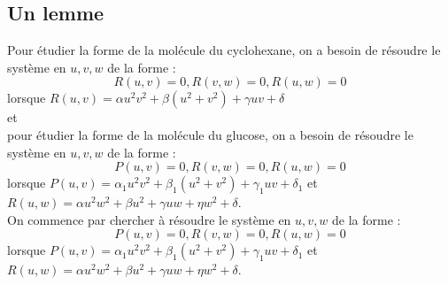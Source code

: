 \documentclass[a4paper,11pt]{book}
\begin{document}
\subsection{Un lemme}
Pour \'etudier la forme de la mol\'ecule du cyclohexane, on a besoin de 
r\'esoudre le syst\`eme en $u,v,w$ de la forme :
$$R(u,v)=0,R(v,w)=0,R(u,w)=0$$
lorsque $R(u,v)=\alpha u^2v^2+\beta(u^2+v^2)+\gamma uv+\delta$\\
et \\
pour \'etudier la forme de la mol\'ecule du glucose, on a besoin de 
r\'esoudre le syst\`eme en $u,v,w$ de la forme :
$$P(u,v)=0,R(v,w)=0,R(u,w)=0$$
lorsque $P(u,v)=\alpha_1 u^2v^2+\beta_1(u^2+v^2)+\gamma_1 uv+\delta_1$ et\\
 $R(u,w)=\alpha u^2w^2+\beta u^2+\gamma uw+\eta w^2+\delta$.\\
On commence par chercher \`a r\'esoudre le syst\`eme en $u,v,w$ de la forme :
$$P(u,v)=0,R(v,w)=0,R(u,w)=0$$
lorsque $P(u,v)=\alpha_1 u^2v^2+\beta_1(u^2+v^2)+\gamma_1 uv+\delta_1$ et\\
 $R(u,w)=\alpha u^2w^2+\beta u^2+\gamma uw+\eta w^2+\delta$.\\
 
\end{document}
